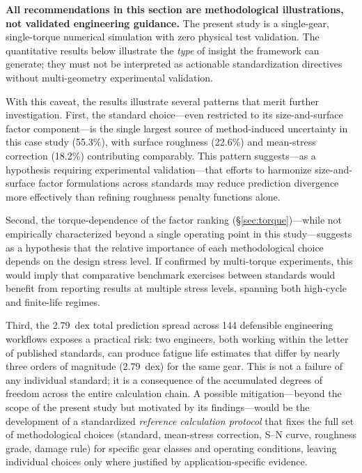 \documentclass[twocolumn,12pt,a4paper]{article}
\begin{document}
\textbf{All recommendations in this section are methodological
illustrations, not validated engineering guidance.} The present study
is a single-gear, single-torque numerical simulation with zero
physical test validation. The quantitative results below illustrate
the \emph{type} of insight the framework can generate; they must not
be interpreted as actionable standardization directives without
multi-geometry experimental validation.

With this caveat, the results illustrate several patterns that merit
further investigation. First, the standard choice---even restricted to
its size-and-surface factor component---is the single largest source
of method-induced uncertainty in this case study (55.3\%), with
surface roughness (22.6\%) and mean-stress correction (18.2\%)
contributing comparably. This pattern suggests---as a hypothesis
requiring experimental validation---that efforts to harmonize
size-and-surface factor formulations across standards may reduce
prediction divergence more effectively than refining roughness penalty
functions alone.

Second, the torque-dependence of the factor ranking
(\S\ref{sec:torque})---while not empirically characterized beyond a
single operating point in this study---suggests as a hypothesis that
the relative importance of each methodological choice depends on the
design stress level. If confirmed by multi-torque experiments, this
would imply that comparative benchmark exercises between standards
would benefit from reporting results at multiple stress levels,
spanning both high-cycle and finite-life regimes.

Third, the 2.79~dex total prediction spread across 144 defensible
engineering workflows exposes a practical risk: two engineers, both
working within the letter of published standards, can produce fatigue
life estimates that differ by nearly three orders of magnitude (2.79~dex) for the same
gear. This is not a failure of any individual standard; it is a
consequence of the accumulated degrees of freedom across the entire
calculation chain. A possible mitigation---beyond the scope of the
present study but motivated by its findings---would be the development
of a standardized \emph{reference calculation protocol} that fixes the
full set of methodological choices (standard, mean-stress correction,
S--N curve, roughness grade, damage rule) for specific gear classes and
operating conditions, leaving individual choices only where justified
by application-specific evidence.
\end{document}
